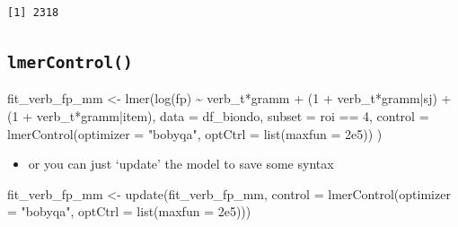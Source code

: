 \documentclass[
  letterpaper,
  DIV=11,
  numbers=noendperiod]{scrartcl}
\newenvironment{Shaded}{\begin{snugshade}}{\end{snugshade}}
\newcommand{\AttributeTok}[1]{\textcolor[rgb]{0.40,0.45,0.13}{#1}}
\newcommand{\CommentTok}[1]{\textcolor[rgb]{0.37,0.37,0.37}{#1}}
\newcommand{\DecValTok}[1]{\textcolor[rgb]{0.68,0.00,0.00}{#1}}
\newcommand{\FloatTok}[1]{\textcolor[rgb]{0.68,0.00,0.00}{#1}}
\newcommand{\FunctionTok}[1]{\textcolor[rgb]{0.28,0.35,0.67}{#1}}
\newcommand{\NormalTok}[1]{\textcolor[rgb]{0.00,0.23,0.31}{#1}}
\newcommand{\OtherTok}[1]{\textcolor[rgb]{0.00,0.23,0.31}{#1}}
\newcommand{\SpecialCharTok}[1]{\textcolor[rgb]{0.37,0.37,0.37}{#1}}
\newcommand{\StringTok}[1]{\textcolor[rgb]{0.13,0.47,0.30}{#1}}
\providecommand{\tightlist}{%
  \setlength{\itemsep}{0pt}\setlength{\parskip}{0pt}}\usepackage{longtable,booktabs,array}
\begin{document}
\begin{Shaded}
\end{Shaded}

\begin{verbatim}
[1] 2318
\end{verbatim}

\hypertarget{lmercontrol}{%
\subsection{\texorpdfstring{\texttt{lmerControl()}}{lmerControl()}}\label{lmercontrol}}

\begin{Shaded}
\begin{Highlighting}[]
\NormalTok{fit\_verb\_fp\_mm }\OtherTok{\textless{}{-}} \FunctionTok{lmer}\NormalTok{(}\FunctionTok{log}\NormalTok{(fp) }\SpecialCharTok{\textasciitilde{}}\NormalTok{ verb\_t}\SpecialCharTok{*}\NormalTok{gramm }\SpecialCharTok{+} 
\NormalTok{                      (}\DecValTok{1} \SpecialCharTok{+}\NormalTok{ verb\_t}\SpecialCharTok{*}\NormalTok{gramm}\SpecialCharTok{|}\NormalTok{sj) }\SpecialCharTok{+}
\NormalTok{                      (}\DecValTok{1} \SpecialCharTok{+}\NormalTok{ verb\_t}\SpecialCharTok{*}\NormalTok{gramm}\SpecialCharTok{|}\NormalTok{item),}
                    \AttributeTok{data =}\NormalTok{ df\_biondo,}
                    \AttributeTok{subset =}\NormalTok{ roi }\SpecialCharTok{==} \DecValTok{4}\NormalTok{,}
                    \AttributeTok{control =} \FunctionTok{lmerControl}\NormalTok{(}\AttributeTok{optimizer =} \StringTok{"bobyqa"}\NormalTok{,}
                                          \AttributeTok{optCtrl =} \FunctionTok{list}\NormalTok{(}\AttributeTok{maxfun =} \FloatTok{2e5}\NormalTok{))}
\NormalTok{)}
\end{Highlighting}
\end{Shaded}

\begin{itemize}
\tightlist
\item
  or you can just `update' the model to save some syntax
\end{itemize}

\begin{Shaded}
\begin{Highlighting}[]
\NormalTok{fit\_verb\_fp\_mm }\OtherTok{\textless{}{-}} \FunctionTok{update}\NormalTok{(fit\_verb\_fp\_mm,}
                         \AttributeTok{control =} \FunctionTok{lmerControl}\NormalTok{(}\AttributeTok{optimizer =} \StringTok{"bobyqa"}\NormalTok{, }
                                                \AttributeTok{optCtrl =} \FunctionTok{list}\NormalTok{(}\AttributeTok{maxfun =} \FloatTok{2e5}\NormalTok{)))}
\end{Highlighting}
\end{Shaded}
\end{document}
